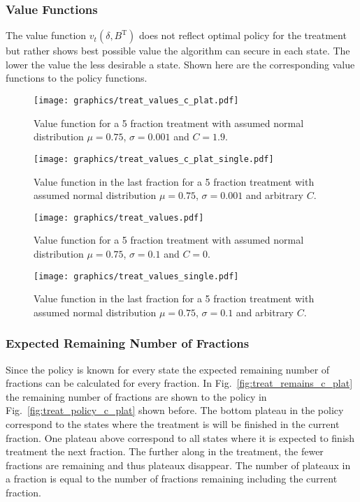 \documentclass[\relativeRoot/ada.tex]{subfiles}
\begin{document}
\subsubsection{Value Functions}

The value function $v_t(\delta, B^{\text{T}})$ does not reflect optimal policy for the treatment but rather shows best possible value the algorithm can secure in each state. The lower the value the less desirable a state. Shown here are the corresponding value functions to the policy functions.

\begin{figure}[!htb]
    \centering
    \texttt{[image: graphics/treat\_values\_c\_plat.pdf]}
    \caption{Value function for a 5 fraction treatment with assumed normal distribution $\mu=0.75$, $\sigma=0.001$ and $C=1.9$.}
    \label{fig:treat_values_c_plat}
\end{figure}

\begin{figure}[!htb]
    \centering
    \texttt{[image: graphics/treat\_values\_c\_plat\_single.pdf]}
    \caption{Value function in the last fraction for a 5 fraction treatment with assumed normal distribution $\mu=0.75$, $\sigma=0.001$ and arbitrary $C$.}
    \label{fig:treat_values_c_plat_single}
\end{figure}

\begin{figure}[!htb]
    \centering
    \texttt{[image: graphics/treat\_values.pdf]}
    \caption{Value function for a 5 fraction treatment with assumed normal distribution $\mu=0.75$, $\sigma=0.1$ and $C=0$.}
    \label{fig:treat_values}
\end{figure}

\begin{figure}[!htb]
    \centering
    \texttt{[image: graphics/treat\_values\_single.pdf]}
    \caption{Value function in the last fraction for a 5 fraction treatment with assumed normal distribution $\mu=0.75$, $\sigma=0.1$ and arbitrary $C$.}
    \label{fig:treat_values_single}
\end{figure}

\subsubsection{Expected Remaining Number of Fractions}

Since the policy is known for every state the expected remaining number of fractions can be calculated for every fraction. In Fig.~\ref{fig:treat_remains_c_plat} the remaining number of fractions are shown to the policy in Fig.~\ref{fig:treat_policy_c_plat} shown before. The bottom plateau in the policy correspond to the states where the treatment is will be finished in the current fraction. One plateau above correspond to all states where it is expected to finish treatment the next fraction. The further along in the treatment, the fewer fractions are remaining and thus plateaux disappear. The number of plateaux in a fraction is equal to the number of fractions remaining including the current fraction.
\end{document}
